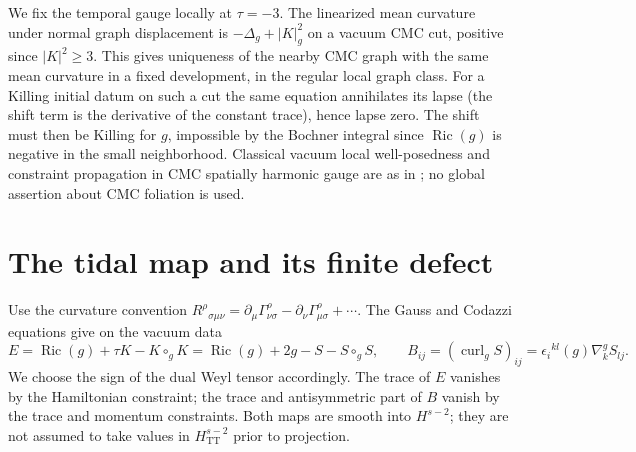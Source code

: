 \documentclass[11pt]{article}
\theoremstyle{remark}
\newcommand{\TT}{\mathrm{TT}}
\newcommand{\Curl}{\operatorname{curl}}
\newcommand{\Ric}{\operatorname{Ric}}
\begin{document}
We fix the temporal gauge locally at \(\tau=-3\). The linearized mean curvature under normal graph displacement is \(-\Delta_g+|K|_g^2\) on a vacuum CMC cut, positive since \(|K|^2\geq 3\). This gives uniqueness of the nearby CMC graph with the same mean curvature in a fixed development, in the regular local graph class. For a Killing initial datum on such a cut the same equation annihilates its lapse (the shift term is the derivative of the constant trace), hence lapse zero. The shift must then be Killing for \(g\), impossible by the Bochner integral since \(\Ric(g)\) is negative in the small neighborhood. Classical vacuum local well-posedness and constraint propagation in CMC spatially harmonic gauge are as in \cite{AMelliptic}; no global assertion about CMC foliation is used.

\section{The tidal map and its finite defect}\label{sec:tidal}

Use the curvature convention \(R^\rho{}_{\sigma\mu\nu}
=\partial_\mu\Gamma^\rho_{\nu\sigma}-\partial_\nu\Gamma^\rho_{\mu\sigma}+\cdots\).
The Gauss and Codazzi equations give on the vacuum data
\begin{equation}
 E=\Ric(g)+\tau K-K\circ_g K
   =\Ric(g)+2g-S-S\circ_g S,\qquad
 B_{ij}=(\Curl_gS)_{ij}=\epsilon_i{}^{kl}(g)\nabla^g_kS_{lj}.
 \label{eq:EB}
\end{equation}
We choose the sign of the dual Weyl tensor accordingly. The trace of \(E\) vanishes by the Hamiltonian constraint; the trace and antisymmetric part of \(B\) vanish by the trace and momentum constraints. Both maps are smooth into \(H^{s-2}\); they are not assumed to take values in \(H^{s-2}_{\TT}\) prior to projection.
\end{document}
